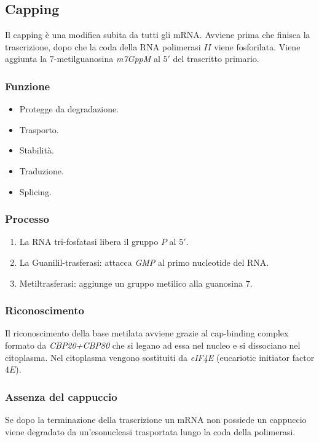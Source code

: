 	\subsection{Capping}
	Il capping \`e una modifica subita da tutti gli mRNA.
	Avviene prima che finisca la trascrizione, dopo che la coda della RNA polimerasi $II$ viene fosforilata.
	Viene aggiunta la $7$-metilguanosina \emph{m7GppM} al $5'$ del trascritto primario.

		\subsubsection{Funzione}
		\begin{multicols}{2}
			\begin{itemize}
				\item Protegge da degradazione.
				\item Trasporto.
				\item Stabilit\`a.
				\item Traduzione.
				\item Splicing.
			\end{itemize}
		\end{multicols}

		\subsubsection{Processo}
		\begin{multicols}{2}
			\begin{enumerate}
				\item La RNA tri-fosfatasi libera il gruppo $P$ al $5'$.
				\item La Guanilil-trasferasi: attacca \emph{GMP} al primo nucleotide del RNA.
				\item Metiltrasferasi: aggiunge un gruppo metilico alla guanosina $7$.
			\end{enumerate}
		\end{multicols}

		\subsubsection{Riconoscimento}
		Il riconoscimento della base metilata avviene grazie al cap-binding complex formato da \emph{CBP20+CBP80} che si legano ad essa nel nucleo e si dissociano nel citoplasma.
		Nel citoplasma vengono sostituiti da \emph{eIF4E} (eucariotic initiator factor $4E$).
		
		\subsubsection{Assenza del cappuccio}
		Se dopo la terminazione della trascrizione un mRNA non possiede un cappuccio viene degradato da un'esonucleasi trasportata lungo la coda della polimerasi.

